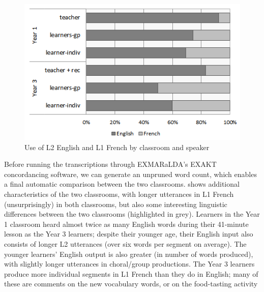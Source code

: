 \documentclass[output=paper,colorlinks,citecolor=brown,modfonts,nonflat]{../langscibook}
\begin{document}
\begin{figure}
\caption{\label{fig:hilton:3}Use of L2 English and L1 French by classroom and speaker}
\includegraphics[width=\textwidth]{figures/hilton-img003.png}
\end{figure}
 

Before running the transcriptions through EXMARaLDA’s \MakeUppercase{Exakt} concordancing software, we can generate an unpruned word count, which enables a final automatic comparison between the two classrooms.  shows additional characteristics of the two classrooms, with longer utterances in L1 French (unsurprisingly) in both classrooms, but also some interesting linguistic differences between the two classrooms (highlighted in grey). Learners in the Year 1 classroom heard almost twice as many English words during their 41-minute lesson as the Year 3 learners; despite their younger age, their English input also consists of longer L2 utterances (over six words per segment on average). The younger learners’ English output is also greater (in number of words produced), with slightly longer utterances in choral/group productions. The Year 3 learners produce more individual segments in L1 French than they do in English; many of these are comments on the new vocabulary words, or on the food-tasting activity
\end{document}
